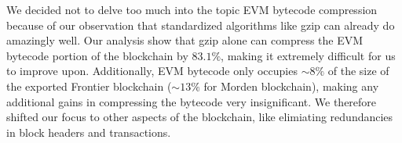We decided not to delve too much into the topic EVM bytecode compression because of our observation that standardized
algorithms like gzip can already do amazingly well. Our analysis show that gzip alone can compress the EVM bytecode
portion of the blockchain by $83.1\%$, making it extremely difficult for us to improve upon.
Additionally, EVM bytecode only occupies $\sim8\%$ of the size of the exported Frontier blockchain ($\sim 13\%$ for Morden blockchain),
making any additional gains in compressing the bytecode very insignificant.
We therefore shifted our focus to other aspects of the blockchain, like elimiating redundancies in block headers
and transactions.

